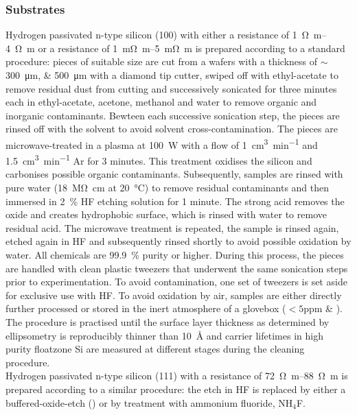 \subsubsection{\sih{} Substrates}
Hydrogen passivated n-type silicon (100) with either a resistance of \SIrange{1}{4}{\ohm\metre} or a resistance of \SIrange{1}{5}{\milli\ohm\metre} is prepared according to a standard procedure: pieces of suitable size are cut from a wafers with a thickness of $\sim$\SIlist{300;500}{\micro\metre} with a diamond tip cutter, swiped off with ethyl-acetate to remove residual dust from cutting and successively sonicated for three minutes each in ethyl-acetate, acetone, methanol and water to remove organic and inorganic contaminants. Bewteen each successive sonication step, the pieces are rinsed off with the  solvent to avoid solvent cross-contamination. The pieces are microwave-treated in a plasma at \SI{100}{\watt} with a flow of \SI{1}{\cubic\centi\metre\per\minute} \oxy{} and \SI{1.5}{\cubic\centi\metre\per\minute} Ar for 3 minutes. This treatment oxidises the silicon and carbonises possible organic contaminants. Subsequently, samples are rinsed with pure water (\SI{18}{\mega\ohm\centi\metre} at \SI{20}{\degreeCelsius}) to remove residual contaminants and then immersed in \SI{2}{\percent} HF etching solution for 1 minute. The strong acid removes the oxide and creates hydrophobic \sih{} surface, which is rinsed with water to remove residual acid. The microwave treatment is repeated, the sample is rinsed again, etched again in HF and subsequently rinsed shortly to avoid possible oxidation by water. All chemicals are \SI{99.9}{\percent} purity or higher. During this process, the pieces are handled with clean plastic tweezers that underwent the same sonication steps prior to experimentation. To avoid contamination, one set of tweezers is set aside for exclusive use with HF. To avoid oxidation by air, samples are either directly further processed or stored in the inert atmosphere of a glovebox ($<\num{5}$ppm \oxy{} \& \water{}).\\
The procedure is practised until the surface layer thickness as determined by ellipsometry is reproducibly thinner than \SI{10}{\angstrom} and carrier lifetimes in high purity floatzone Si are measured at different stages during the cleaning procedure.\\
Hydrogen passivated n-type silicon (111) with a resistance of \SIrange{72}{88}{\ohm\metre} is prepared according to a similar procedure: the etch in HF is replaced by either a buffered-oxide-etch (\boe{}) or by treatment with ammonium fluoride, NH$_4$F.
